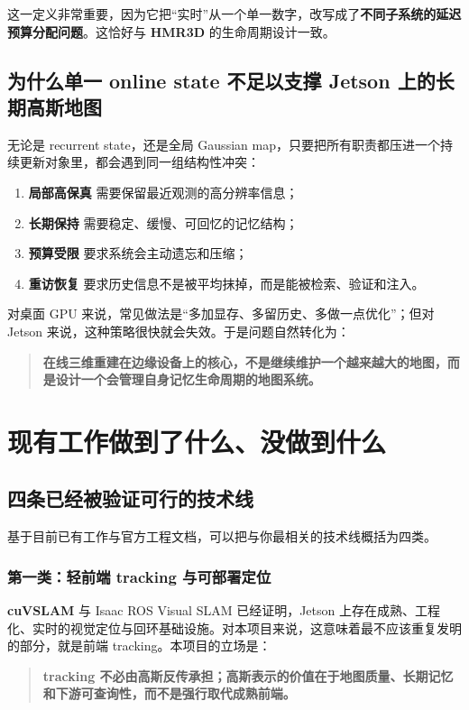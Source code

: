 \documentclass[12pt]{article}
\newcommand{\hmr}{\textbf{HMR3D}}
\newcommand{\cuvslam}{\textbf{cuVSLAM}}
\begin{document}
这一定义非常重要，因为它把“实时”从一个单一数字，改写成了\textbf{不同子系统的延迟预算分配问题}。这恰好与 \hmr{} 的生命周期设计一致。

\subsection{为什么单一 online state 不足以支撑 Jetson 上的长期高斯地图}

无论是 recurrent state，还是全局 Gaussian map，只要把所有职责都压进一个持续更新对象里，都会遇到同一组结构性冲突：
\begin{enumerate}
  \item \textbf{局部高保真} 需要保留最近观测的高分辨率信息；
  \item \textbf{长期保持} 需要稳定、缓慢、可回忆的记忆结构；
  \item \textbf{预算受限} 要求系统会主动遗忘和压缩；
  \item \textbf{重访恢复} 要求历史信息不是被平均抹掉，而是能被检索、验证和注入。
\end{enumerate}

对桌面 GPU 来说，常见做法是“多加显存、多留历史、多做一点优化”；但对 Jetson 来说，这种策略很快就会失效。于是问题自然转化为：
\begin{quote}
\textbf{在线三维重建在边缘设备上的核心，不是继续维护一个越来越大的地图，而是设计一个会管理自身记忆生命周期的地图系统。}
\end{quote}

\section{现有工作做到了什么、没做到什么}

\subsection{四条已经被验证可行的技术线}

基于目前已有工作与官方工程文档，可以把与你最相关的技术线概括为四类。

\subsubsection{第一类：轻前端 tracking 与可部署定位}

\cuvslam{} 与 Isaac ROS Visual SLAM 已经证明，Jetson 上存在成熟、工程化、实时的视觉定位与回环基础设施。对本项目来说，这意味着最不应该重复发明的部分，就是前端 tracking。本项目的立场是：
\begin{quote}
\textbf{tracking 不必由高斯反传承担；高斯表示的价值在于地图质量、长期记忆和下游可查询性，而不是强行取代成熟前端。}
\end{quote}
\end{document}
